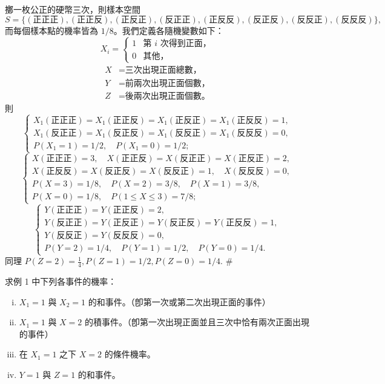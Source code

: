 \medskip
\begin{example}\label{ex:b5-5-1}
擲一枚公正的硬幣三次，則樣本空間
\[
S = \{(\text{正正正}), (\text{正正反}), (\text{正反正}), (\text{反正正}), (\text{正反反}), (\text{反正反}), (\text{反反正}), (\text{反反反})\},
\]
而每個樣本點的機率皆為 $1/8$。我們定義各隨機變數如下：
\[
X_i = \begin{cases}
1 & \text{第 $i$ 次得到正面，} \\
0 & \text{其他，}
\end{cases}
\]
\begin{align*}
X &= \text{三次出現正面總數，} \\
Y &= \text{前兩次出現正面個數，} \\
Z &= \text{後兩次出現正面個數。}
\end{align*}
則
\[
\begin{cases}
X_1(\text{正正正}) = X_1(\text{正正反}) = X_1(\text{正反正}) = X_1(\text{正反反}) = 1, \\
X_1(\text{反正正}) = X_1(\text{反正反}) = X_1(\text{反反正}) = X_1(\text{反反反}) = 0, \\
P(X_1 = 1) = 1/2, \quad P(X_1 = 0) = 1/2;
\end{cases}
\]
\[
\begin{cases}
X(\text{正正正}) = 3, \quad X(\text{正正反}) = X(\text{反正正}) = X(\text{正反正}) = 2, \\
X(\text{正反反}) = X(\text{反正反}) = X(\text{反反正}) = 1, \quad X(\text{反反反}) = 0, \\
P(X = 3) = 1/8, \quad P(X = 2) = 3/8, \quad P(X = 1) = 3/8, \\
P(X = 0) = 1/8, \quad P(1 \le X \le 3) = 7/8;
\end{cases}
\]
\[
\begin{cases}
Y(\text{正正正}) = Y(\text{正正反}) = 2, \\
Y(\text{反正正}) = Y(\text{正反正}) = Y(\text{反正反}) = Y(\text{正反反}) = 1, \\
Y(\text{反反正}) = Y(\text{反反反}) = 0, \\
P(Y = 2) = 1/4, \quad P(Y = 1) = 1/2, \quad P(Y = 0) = 1/4.
\end{cases}
\]
同理 $P(Z = 2) = \frac{1}{4}, P(Z = 1) = 1/2, P(Z = 0) = 1/4$. \hfill $\#$
\end{example}

\medskip
\begin{example}\label{ex:b5-5-2}
求例 1 中下列各事件的機率：
\begin{enumerate}[(i)]
  \item $X_1 = 1$ 與 $X_2 = 1$ 的和事件。（卽第一次或第二次出現正面的事件）
  \item $X_1 = 1$ 與 $X = 2$ 的積事件。（卽第一次出現正面並且三次中恰有兩次正面出現的事件）
  \item 在 $X_1 = 1$ 之下 $X = 2$ 的條件機率。
  \item $Y = 1$ 與 $Z = 1$ 的和事件。
\end{enumerate}
\end{example}
